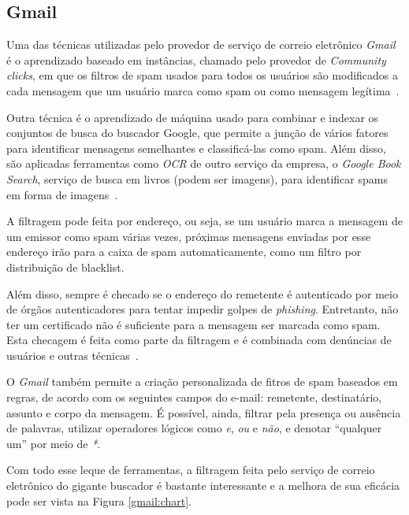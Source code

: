 \documentclass[a4paper,dvipdfm]{article}
\begin{document}
	\subsection{Gmail}
		Uma das técnicas utilizadas pelo provedor de serviço de correio eletrônico \emph{Gmail} é o aprendizado baseado em instâncias, chamado pelo provedor de \emph{Community clicks}, em que os filtros de spam usados para todos os usuários são modificados a cada mensagem que um usuário marca como spam ou como mensagem legítima~\cite{gmail:fightspam}.

		Outra técnica é o aprendizado de máquina usado para combinar e indexar os conjuntos de busca do buscador Google, que permite a junção de vários fatores para identificar mensagens semelhantes e classificá-las como spam.
		Além disso, são aplicadas ferramentas como \emph{OCR} de outro serviço da empresa, o \emph{Google Book Search}, serviço de busca em livros (podem ser imagens), para identificar spams em forma de imagens~\cite{gmail:youtube}.

		A filtragem pode feita por endereço, ou seja, se um usuário marca a mensagem de um emissor como spam várias vezes, próximas mensagens enviadas por esse endereço irão para a caixa de spam automaticamente, como um filtro por distribuição de blacklist.

		Além disso, sempre é checado se o endereço do remetente é autenticado por meio de órgãos autenticadores para tentar impedir golpes de \emph{phishing}.
		Entretanto, não ter um certificado não é suficiente para a mensagem ser marcada como spam.
		Esta checagem é feita como parte da filtragem e é combinada com denúncias de usuários e outras técnicas~\cite{gmail:filtros}.

		O \emph{Gmail} também permite a criação personalizada de fitros de spam baseados em regras, de acordo com os seguintes campos do e-mail: remetente, destinatário, assunto e corpo da mensagem. 
		É possível, ainda, filtrar pela presença ou ausência de palavras, utilizar operadores lógicos como \emph{e}, \emph{ou} e \emph{não}, e denotar ``qualquer um'' por meio de \emph{*}.

		Com todo esse leque de ferramentas, a filtragem feita pelo serviço de correio eletrônico do gigante buscador é bastante interessante e a melhora de sua eficácia pode ser vista na Figura \ref{gmail:chart}.
\end{document}
